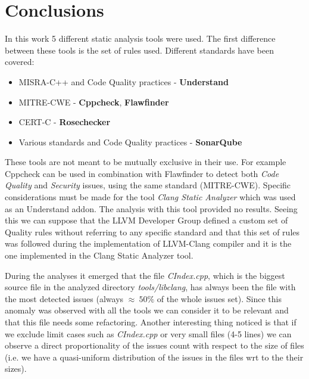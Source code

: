 \chapter{Conclusions}

In this work 5 different static analysis tools were used.\newline
The first difference between these tools is the set of rules used. Different standards have been covered:

\begin{itemize}
	\item MISRA-C++ and Code Quality practices - \textbf{Understand}
	\item MITRE-CWE - \textbf{Cppcheck}, \textbf{Flawfinder}
	\item CERT-C - \textbf{Rosechecker}
	\item Various standards and Code Quality practices - \textbf{SonarQube}
\end{itemize}

These tools are not meant to be mutually exclusive in their use. For example Cppcheck can be used in combination with Flawfinder to detect both \textsl{Code Quality} and \textsl{Security} issues, using the same standard (MITRE-CWE).\newline
Specific considerations must be made for the tool \textsl{Clang Static Analyzer} which was used as an Understand addon.\newline
The analysis with this tool provided no results. Seeing this we can suppose that the LLVM Developer Group defined a custom set of Quality rules without referring to any specific standard and that this set of rules was followed during the implementation of LLVM-Clang compiler and it is the one implemented in the Clang Static Analyzer tool.
\newline\newline

During the analyses it emerged that the file \textsl{CIndex.cpp}, which is the biggest source file in the analyzed directory \textsl{tools/libclang}, has always been the file with the most detected issues (always $\approx\: 50\%$ of the whole issues set). Since this anomaly was observed with all the tools we can consider it to be relevant and that this file needs some refactoring.\newline
Another interesting thing noticed is that if we exclude limit cases such as \textsl{CIndex.cpp} or very small files (4-5 lines) we can observe a direct proportionality of the issues count with respect to the size of files (i.e. we have a quasi-uniform distribution of the issues in the files wrt to the their sizes).\newline\newline

